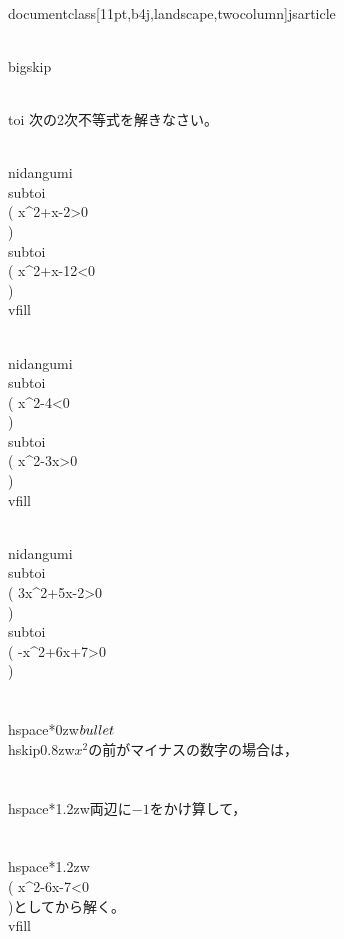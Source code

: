 \\documentclass[11pt,b4j,landscape,twocolumn]{jsarticle}
\begin{document}
\\bigskip

\\toi 次の2次不等式を解きなさい。

\\nidangumi{\\subtoi \\( x^2+x-2>0 \\) }
			{\\subtoi  \\( x^2+x-12<0 \\) }\\vfill

\\nidangumi{\\subtoi \\( x^2-4<0 \\) }
			{\\subtoi  \\(  x^2-3x>0  \\) }\\vfill

\\nidangumi{\\subtoi \\( 3x^2+5x-2>0 \\) }
			{\\subtoi  \\(  -x^2+6x+7>0 \\)\\\\
\\hspace*{0zw}$\\bullet$\\hskip0.8zw$x^2$の前がマイナスの数字の場合は，\\\\
\\hspace*{1.2zw}両辺に$-1$をかけ算して，\\\\
\\hspace*{1.2zw}\\( x^2-6x-7<0 \\)としてから解く。}\\vfill

\
\end{document}
